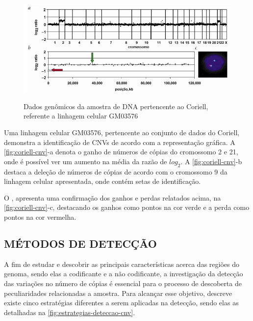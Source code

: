 \begin{figure}[!htb]
    \centering
    \caption{Dados genômicos da amostra de DNA pertencente ao Coriell, referente a linhagem celular GM03576}
    \includegraphics[width=1\textwidth]{./dados/figuras/coriell-cnv}
    \label{fig:coriell-cnv}
\end{figure}

Uma linhagem celular GM03576, pertencente ao conjunto de dados do Coriell, demonstra a identificação de CNVs de acordo com a representação gráfica. A \autoref{fig:coriell-cnv}-a denota o ganho de números de cópias do cromossomo 2 e 21, onde é possível ver um aumento na média da razão de $log_{2}$. A \autoref{fig:coriell-cnv}-b destaca a deleção de números de cópias de acordo com o cromossomo 9 da linhagem celular apresentada, onde contém setas de identificação. 

O \cite{Snijders2001}, apresenta uma confirmação dos ganhos e perdas relatados acima, na \autoref{fig:coriell-cnv}-c, destacando os ganhos como pontos na cor verde e a perda como pontos na cor vermelha.

\subsection{MÉTODOS DE DETECÇÃO} 

A fim de estudar e descobrir as principais características acerca das regiões do genoma, sendo elas a codificante e a não codificante, a investigação da detecção das variações no número de cópias é essencial para o processo de descoberta de peculiaridades relacionadas a amostra. Para alcançar esse objetivo, \cite{Zhao2013} descreve existe cinco estratégias diferentes a serem aplicadas na detecção, sendo elas as detalhadas na \autoref{fig:estrategias-deteccao-cnv}.

